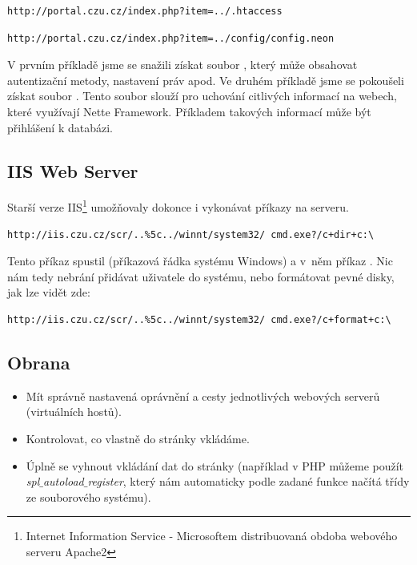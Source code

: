 \begin{lstlisting}[label=man_url_get_htaccess,caption=Manipulace s URL - získání .htaccess]
http://portal.czu.cz/index.php?item=../.htaccess
\end{lstlisting}

\begin{lstlisting}[label=man_url_get_neon,caption=Manipulace s URL - získání config.neon]
http://portal.czu.cz/index.php?item=../config/config.neon
\end{lstlisting}

V prvním příkladě jsme se snažili získat soubor , který může obsahovat autentizační metody, nastavení práv apod. Ve druhém příkladě jsme se pokoušeli získat soubor . Tento soubor slouží pro uchování citlivých informací na webech, které využívají Nette Framework. Příkladem takových informací může být přihlášení k databázi.

\subsection{IIS Web Server}
Starší verze IIS\footnote{Internet Information Service - Microsoftem distribuovaná obdoba webového serveru Apache2} umožňovaly dokonce i vykonávat příkazy na serveru.

\begin{lstlisting}[label=iis_derave,caption=Ukázka URL pro \uv{děravé} IIS]
http://iis.czu.cz/scr/..%5c../winnt/system32/ cmd.exe?/c+dir+c:\
\end{lstlisting}

Tento příkaz spustil  (příkazová řádka systému Windows) a v~něm příkaz . Nic nám tedy nebrání přidávat uživatele do systému, nebo formátovat pevné disky, jak lze vidět zde:

\begin{lstlisting}[label=iis_derave_format,caption=Formátování disku C: přes chybu v IIS]
http://iis.czu.cz/scr/..%5c../winnt/system32/ cmd.exe?/c+format+c:\
\end{lstlisting}

\subsection{Obrana}
\begin{itemize}
\item Mít správně nastavená oprávnění a cesty jednotlivých webových serverů (virtuálních hostů).
\item Kontrolovat, co vlastně do stránky vkládáme.
\item Úplně se vyhnout vkládání dat do stránky (například v PHP můžeme použít \textit{spl$\_$autoload$\_$register}, který nám automaticky podle zadané funkce načítá třídy ze souborového systému).
\end{itemize}

